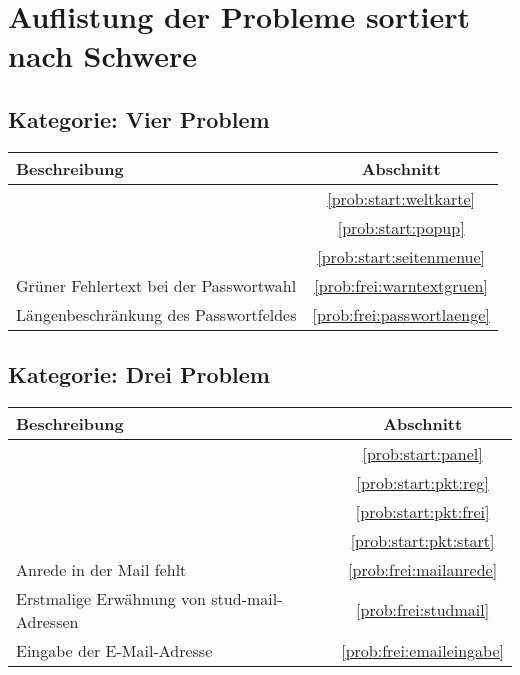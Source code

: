\section{Auflistung der Probleme sortiert nach Schwere}

\subsection*{Kategorie: Vier Problem}
\begin{tabular}{|p{12cm}|c|}
\hline
\textbf{Beschreibung} & \textbf{Abschnitt} \\
\hline\hline
\nameref{prob:start:weltkarte} & \ref{prob:start:weltkarte} \\ 
\nameref{prob:start:popup} & \ref{prob:start:popup}\\
\nameref{prob:start:seitenmenue} & \ref{prob:start:seitenmenue}\\
Grüner Fehlertext bei der Passwortwahl & \ref{prob:frei:warntextgruen}\\
Längenbeschränkung des Passwortfeldes & \ref{prob:frei:passwortlaenge}\\
\hline
\end{tabular}

\subsection*{Kategorie: Drei Problem}
\begin{tabular}{|p{12cm}|c|}
\hline
\textbf{Beschreibung} & \textbf{Abschnitt} \\
\hline\hline
\nameref{prob:start:panel} & \ref{prob:start:panel} \\
\nameref{prob:start:pkt:reg} & \ref{prob:start:pkt:reg}\\
\nameref{prob:start:pkt:frei} & \ref{prob:start:pkt:frei}\\
\nameref{prob:start:pkt:start} & \ref{prob:start:pkt:start}\\
Anrede in der Mail fehlt & \ref{prob:frei:mailanrede}\\
Erstmalige Erwähnung von stud-mail-Adressen & \ref{prob:frei:studmail}\\
Eingabe der E-Mail-Adresse & \ref{prob:frei:emaileingabe}\\
\hline

\end{tabular}

